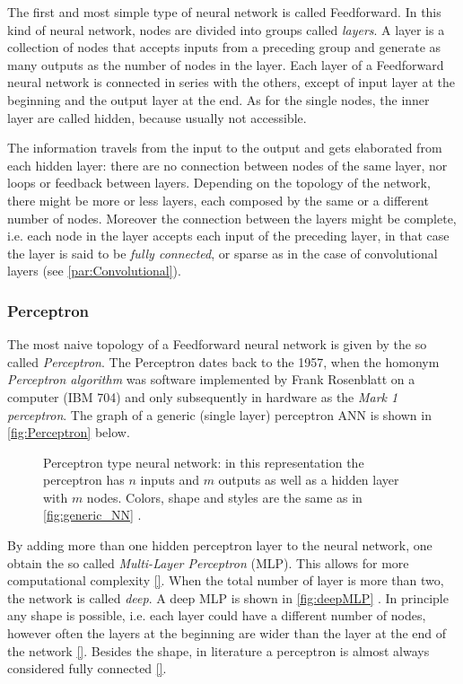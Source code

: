 The first and most simple type of neural network is called Feedforward.
In this kind of neural network, nodes are divided into groups called \textit{layers}.
A layer is a collection of nodes that accepts inputs from a preceding group and generate as many outputs as the number of nodes in the layer.
Each layer of a Feedforward neural network is connected in series with the others, except of input layer at the beginning and the output layer at the end.
As for the single nodes, the inner layer are called hidden, because usually not accessible.

The information travels from the input to the output and gets elaborated from each hidden layer: there are no connection between nodes of the same layer, nor loops or feedback between layers.
Depending on the topology of the network, there might be more or less layers, each composed by the same or a different number of nodes.
Moreover the connection between the layers might be complete, i.e. each node in the layer accepts each input of the preceding layer, in that case the layer is said to be \textit{fully connected}, or sparse as in the case of convolutional layers (see \autoref{par:Convolutional}).

\subsubsection{Perceptron}
\label{sssec:Perceptron}

The most naive topology of a Feedforward neural network is given by the so called \textit{Perceptron}.
The Perceptron dates back to the 1957, when the homonym \textit{Perceptron algorithm} was software implemented by Frank Rosenblatt on a computer (IBM 704) and only subsequently in hardware as the \textit{Mark 1 perceptron}\cite{frank1957perceptron,Rosenblatt1958}.
The graph of a generic (single layer) perceptron ANN is shown in \autoref{fig:Perceptron} below.

\begin{figure}[ht]
	\centering
	
	\caption{%
		Perceptron type neural network: in this representation the perceptron has $n$ inputs and $m$ outputs as well as a hidden layer with $m$ nodes. %
		Colors, shape and styles are the same as in \autoref{fig:generic_NN} .%
		}
	\label{fig:Perceptron}
\end{figure}

By adding more than one hidden perceptron layer to the neural network, one obtain the so called \textit{Multi-Layer Perceptron} (MLP).
This allows for more computational complexity \ref{}.
When the total number of layer is more than two, the network is called \textit{deep}.
A deep MLP is shown in \autoref{fig:deepMLP} .
In principle any shape is possible, i.e. each layer could have a different number of nodes, however often the layers at the beginning are wider than the layer at the end of the network \ref{}.
Besides the shape, in literature a perceptron is almost always considered fully connected \ref{}.

